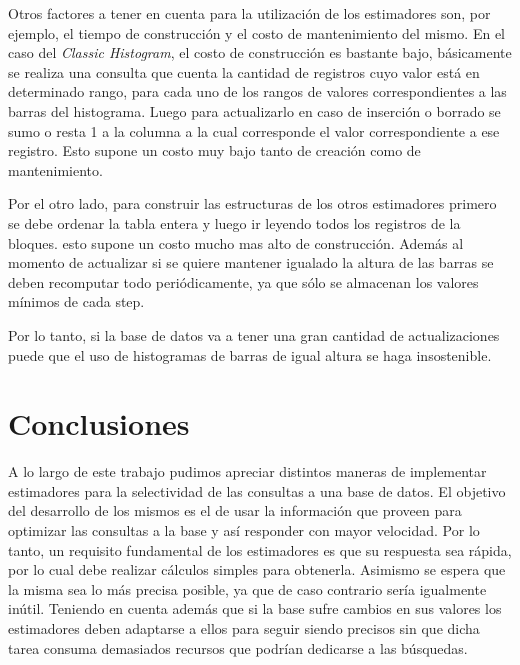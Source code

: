 \documentclass[a4paper, 10pt, twoside]{article}
\begin{document}
Otros factores a tener en cuenta para la utilización de los estimadores son, por ejemplo, el tiempo de construcción y el costo de mantenimiento del mismo.
En el caso del \textit{Classic Histogram}, el costo de construcción es bastante bajo, básicamente se realiza una consulta que cuenta la cantidad de registros cuyo valor está en determinado rango, para cada uno de los rangos de valores correspondientes a las barras del histograma. Luego para actualizarlo en caso de inserción o borrado se sumo o resta 1 a la columna a la cual corresponde el valor correspondiente a ese registro.
Esto supone un costo muy bajo tanto de creación como de mantenimiento.

Por el otro lado, para construir las estructuras de los otros estimadores primero se debe ordenar la tabla entera y luego ir leyendo todos los registros de la bloques. esto supone un costo mucho mas alto de construcción. Además al momento de actualizar si se quiere mantener igualado la altura de las barras se deben recomputar todo periódicamente, ya que sólo se almacenan los valores mínimos de cada step.

Por lo tanto, si la base de datos va a tener una gran cantidad de actualizaciones puede que el uso de histogramas de barras de igual altura se haga insostenible.



\section{Conclusiones}
A lo largo de este trabajo pudimos apreciar distintos maneras de implementar estimadores para la selectividad de las consultas a una base de datos.
El objetivo del desarrollo de los mismos es el de usar la información que proveen para optimizar las consultas a la base y así responder con mayor velocidad. Por lo tanto, un requisito fundamental de los estimadores es que su respuesta sea rápida, por lo cual debe realizar cálculos simples para obtenerla. Asimismo se espera que la misma sea lo más precisa posible, ya que de caso contrario sería igualmente inútil. Teniendo en cuenta además que si la base sufre cambios en sus valores los estimadores deben adaptarse a ellos para seguir siendo precisos sin que dicha tarea consuma demasiados recursos que podrían dedicarse a las búsquedas.
\end{document}
